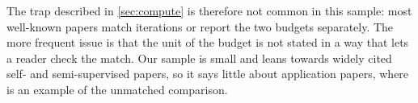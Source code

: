 The trap described in \cref{sec:compute} is therefore not common in this sample: most well-known papers
match iterations or report the two budgets separately. The more frequent issue is that the unit of the
budget is not stated in a way that lets a reader check the match. Our sample is small and leans towards
widely cited self- and semi-supervised papers, so it says little about application papers, where
\citet{Benato2023Linking} is an example of the unmatched comparison.
